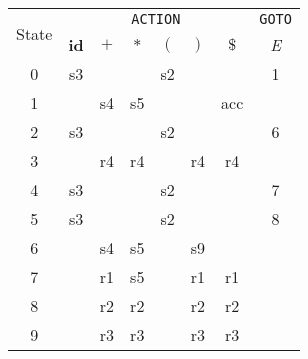 \documentclass[border=0.8ex,varwidth]{standalone}
\begin{document}
\begin{table}
  \begin{tabular}{cccccccc}
    \toprule
    \multirow{2}{*}{State} & \multicolumn{6}{c}{\texttt{ACTION}} &
                                                                  \texttt{GOTO}\\
    \cline{2-8}
                          & \textbf{id} & \(+\) & \(*\) & \((\) & \()\) & \(\$\)
                                                                & \textit{E}\\
    \midrule
    0 & s3 & & & s2 & & & 1\\
    1 & & s4 & s5 & & & acc & \\
    2 & s3 & & & s2 & & & 6\\
    3 & & r4 & r4 & & r4 & r4 & \\
    4 & s3 & & & s2 & & & 7\\
    5 & s3 & & & s2 & & & 8\\
    6 & & s4 & s5 & & s9 & & \\
    7 & & r1 & s5 & & r1 & r1 & \\
    8 & & r2 & r2 & & r2 & r2 & \\
    9 & & r3 & r3 & & r3 & r3 & \\
    \bottomrule
  \end{tabular}
\end{table}
\end{document}
